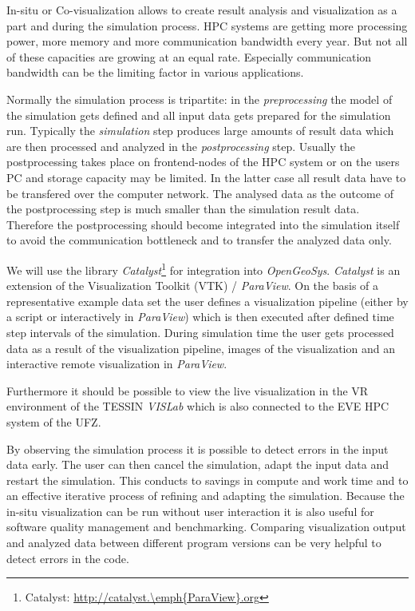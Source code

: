 In-situ or Co-visualization allows to create result analysis and
visualization as a part and during the simulation process. HPC systems
are getting more processing power, more memory and more
communication bandwidth every year. But not all of these capacities are
growing at an equal rate. Especially communication bandwidth can be the
limiting factor in various applications.

Normally the simulation process is tripartite: in the
\emph{preprocessing} the model of the simulation gets defined and all
input data gets prepared for the simulation run. Typically the
\emph{simulation} step produces large amounts of result data which are
then processed and analyzed in the \emph{postprocessing} step. Usually
the postprocessing takes place on frontend-nodes of the HPC system or on
the users PC and storage capacity may be limited. In the latter case all
result data have to be transfered over the computer network. The analysed
data as the outcome of the postprocessing step is much smaller than the
simulation result data. Therefore the postprocessing should become
integrated into the simulation itself to avoid the communication bottleneck
and to transfer the analyzed data only.

We will use the library \emph{Catalyst}\footnote{Catalyst: \url{http://catalyst.\emph{ParaView}.org}} for
integration into \emph{OpenGeoSys}. \emph{Catalyst} is an extension of the
Visualization Toolkit (VTK) / \emph{ParaView}. On the basis of a representative
example data set the user defines a visualization pipeline (either by a
script or interactively in \emph{ParaView}) which is then executed after
defined time step intervals of the simulation. During simulation time
the user gets processed data as a result of the visualization pipeline,
images of the visualization and an interactive remote visualization in
\emph{ParaView}.

Furthermore it should be possible to view the live visualization in the
VR environment of the TESSIN \emph{VISLab} which is also connected to the EVE HPC
system of the UFZ.

By observing the simulation process it is possible to detect errors in
the input data early. The user can then cancel the simulation, adapt the
input data and restart the simulation. This conducts to savings in
compute and work time and to an effective iterative process of refining
and adapting the simulation. Because the in-situ visualization can be
run without user interaction it is also useful for software quality
management and benchmarking. Comparing visualization output and analyzed
data between different program versions can be very helpful to detect
errors in the code.

